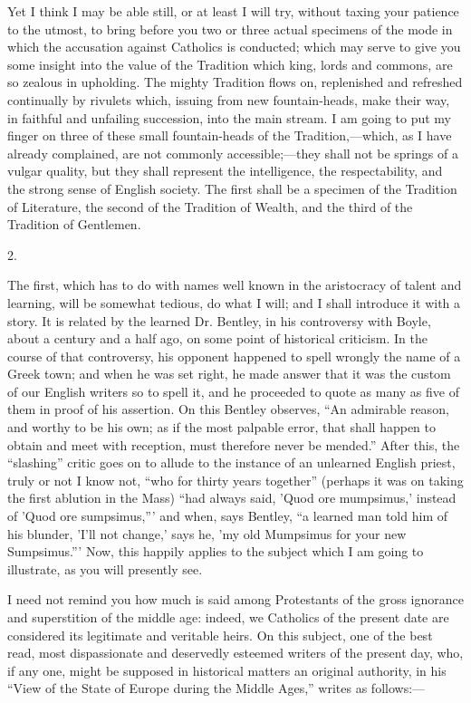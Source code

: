 Yet I think I may be able still, or at least I will
try, without taxing your patience to the utmost, to bring
before you two or three actual specimens of the mode in
which the accusation against Catholics is conducted;
which may serve to give you some insight into the value
of the Tradition which king, lords and commons, are so
zealous in upholding. The mighty Tradition flows on,
replenished and refreshed continually by rivulets which,
issuing from new fountain-heads, make their way, in
faithful and unfailing succession, into the main stream.
I am going to put my finger on three of these small
fountain-heads of the Tradition,—which, as I have
already complained, are not commonly
accessible;—they shall not be springs of a vulgar
quality, but they shall represent the intelligence, the
respectability, and the strong sense of English society.
The first shall be a specimen of the Tradition of
Literature, the second of the Tradition of Wealth, and
the third of the Tradition of Gentlemen.

2.

The first, which has to do with names well known in
the aristocracy of talent and learning, will be somewhat
tedious, do what I will; and I shall introduce it with a
story. It is related by the learned Dr. Bentley, in his
controversy with Boyle, about a century and a half ago,
on some point of historical criticism. In the course of
that controversy, his opponent happened to spell wrongly
the name of a Greek town; and when he was set right, he
made answer that it was the custom of our English writers
so to spell it, and he proceeded to quote as many as five
of them in proof of his assertion. On this Bentley
observes, ``An admirable reason, and worthy to be his
own; as if the most palpable error, that shall happen to
obtain and meet with reception, must therefore never be
mended.'' After this, the ``slashing'' critic
goes on to allude to the instance of an unlearned English
priest, truly or not I know not, ``who for thirty
years together'' (perhaps it was on taking the first
ablution in the Mass) ``had always said, 'Quod ore
mumpsimus,' instead of 'Quod ore sumpsimus,''' and
when, says Bentley, ``a learned man told him of his
blunder, 'I'll not change,' says he, 'my old Mumpsimus
for your new Sumpsimus.''' Now, this happily applies
to the subject which I am going to illustrate, as you
will presently see.

I need not remind you how much is said among
Protestants of the gross ignorance and superstition of
the middle age: indeed, we Catholics of the present date
are considered its legitimate and veritable heirs. On
this subject, one of the best read, most dispassionate and deservedly esteemed writers of the present day, who,
if any one, might be supposed in historical matters an
original authority, in his ``View of the State of
Europe during the Middle Ages,'' writes as
follows:—

